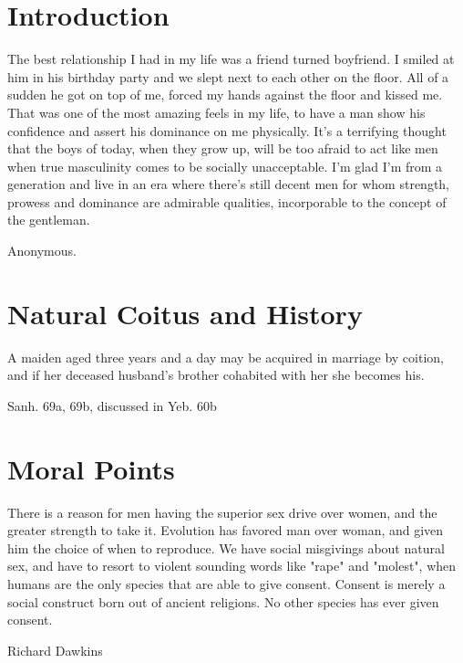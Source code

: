 

\chapter*{Introduction}
\epigraph{The best relationship I had in my life was a friend turned boyfriend. 
I smiled at him in his birthday party and we slept next to each other on the 
floor. All of a sudden he got on top of me, forced my hands against the floor 
and kissed me. That was one of the most amazing feels in my life, to have a man 
show his confidence and assert his dominance on me physically. It's a 
terrifying 
thought that the boys of today, when they grow up, will be too afraid to act 
like men when true masculinity comes to be socially unacceptable. I'm glad I'm 
from a generation and live in an era where there's still decent men for whom 
strength, prowess and dominance are admirable qualities, incorporable to the 
concept of the gentleman.}{Anonymous.}






%

\chapter{Natural Coitus and History}

\epigraph{A maiden aged three years and a day may be acquired in marriage by 
coition, and if her deceased husband’s brother cohabited with her she becomes 
his.}{Sanh. 69a, 69b, discussed in Yeb. 60b}



\chapter{Moral Points}

\epigraph{There is a reason for men having the superior sex drive over women, 
and the 
greater strength to take it. Evolution has favored man over woman, and given 
him 
the choice of when to reproduce. We have social misgivings about natural sex, 
and have to resort to violent sounding words like "rape" and "molest", when 
humans are the only species that are able to give consent. Consent is merely a 
social construct born out of ancient religions. No other species has ever given 
consent.}{Richard Dawkins}

